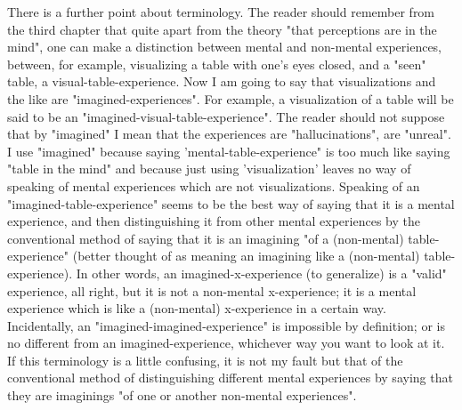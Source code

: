 \documentclass[10pt,twoside,draft]{memoir}
\begin{document}
{There is a further point about terminology. The reader should 
remember from the third chapter that quite apart from the theory "that 
perceptions are in the mind", one can make a distinction between mental 
and non-mental experiences, between, for example, visualizing a table with 
one's eyes closed, and a "seen" table, a visual-table-experience. Now I am 
going to say that visualizations and the like are "imagined-experiences". For 
example, a visualization of a table will be said to be an 
"imagined-visual-table-experience". The reader should not suppose that by 
"imagined" I mean that the experiences are "hallucinations", are "unreal". I 
use "imagined" because saying 'mental-table-experience" is too much like 
saying "table in the mind" and because just using 'visualization' leaves no way 
of speaking of mental experiences which are not visualizations. Speaking of 
an "imagined-table-experience" seems to be the best way of saying that it is 
a mental experience, and then distinguishing it from other mental 
experiences by the conventional method of saying that it is an imagining "of 
a (non-mental) table-experience" (better thought of as meaning an imagining 
like a  (non-mental)  table-experience). In other words, an 
imagined-x-experience (to generalize) is a "valid" experience, all right, but it 
is not a non-mental x-experience; it is a mental experience which is like a 
(non-mental) x-experience in a certain way. Incidentally, an "imagined-imagined-experience" is impossible by definition; or is no different from an 
imagined-experience, whichever way you want to look at it. If this 
terminology is a little confusing, it is not my fault but that of the 
conventional method of distinguishing different mental experiences by 
saying that they are imaginings "of one or another non-mental experiences". 

}
\end{document}
